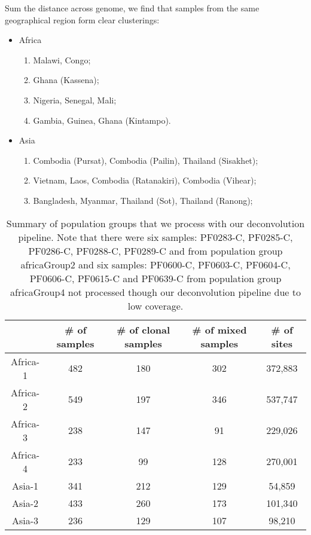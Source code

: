 \documentclass{article}
\begin{document}
Sum the distance across genome, we find that samples from the same geographical region form clear clusterings:
\begin{itemize}
\item Africa
\begin{enumerate}
\item Malawi, Congo;
\item Ghana (Kassena);
\item Nigeria, Senegal, Mali;
\item Gambia, Guinea, Ghana (Kintampo).
\end{enumerate}
\item Asia
\begin{enumerate}
\item Combodia (Pursat), Combodia (Pailin), Thailand (Sisakhet);
\item Vietnam, Laos, Combodia (Ratanakiri), Combodia (Vihear);
\item Bangladesh, Myanmar, Thailand (Sot), Thailand (Ranong);
\end{enumerate}
\end{itemize}






\begin{table}[ht]
\centering
\begin{tabular}{|c|c|c|c|c|}
\hline\hline
        & \# of samples  & \# of clonal samples & \# of mixed samples & \# of sites\\
        \hline
Africa-1 & 482 & 180 & 302 & 372,883 \\
Africa-2 & 549 & 197 & 346 & 537,747 \\
Africa-3	& 238 & 147 & 91  & 229,026 \\
Africa-4	& 233 & 99  & 128 & 270,001 \\
Asia-1	  & 341 & 212 & 129 & 54,859  \\
Asia-2	  & 433 & 260 & 173 & 101,340 \\
Asia-3	  & 236 & 129 & 107 & 98,210  \\
\hline
\hline
\end{tabular}
\caption{Summary of population groups that we process with our deconvolution pipeline. Note that there were six samples: PF0283-C, PF0285-C, PF0286-C, PF0288-C, PF0289-C and from population group africaGroup2 and six samples: PF0600-C, PF0603-C, PF0604-C, PF0606-C, PF0615-C and PF0639-C from population group africaGroup4 not processed though our deconvolution pipeline due to low coverage.}\label{tab:panelSamples}
\end{table}
\end{document}
